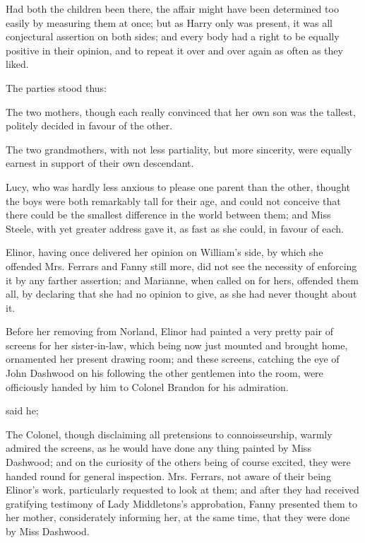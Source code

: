 Had both the children been there, the affair might have been determined too easily by measuring them at once; but as Harry only was present, it was all conjectural assertion on both sides; and every body had a right to be equally positive in their opinion, and to repeat it over and over again as often as they liked.

The parties stood thus:

The two mothers, though each really convinced that her own son was the tallest, politely decided in favour of the other.

The two grandmothers, with not less partiality, but more sincerity, were equally earnest in support of their own descendant.

Lucy, who was hardly less anxious to please one parent than the other, thought the boys were both remarkably tall for their age, and could not conceive that there could be the smallest difference in the world between them; and Miss Steele, with yet greater address gave it, as fast as she could, in favour of each.

Elinor, having once delivered her opinion on William's side, by which she offended Mrs. Ferrars and Fanny still more, did not see the necessity of enforcing it by any farther assertion; and Marianne, when called on for hers, offended them all, by declaring that she had no opinion to give, as she had never thought about it.

Before her removing from Norland, Elinor had painted a very pretty pair of screens for her sister-in-law, which being now just mounted and brought home, ornamented her present drawing room; and these screens, catching the eye of John Dashwood on his following the other gentlemen into the room, were officiously handed by him to Colonel Brandon for his admiration.

 said he; 

The Colonel, though disclaiming all pretensions to connoisseurship, warmly admired the screens, as he would have done any thing painted by Miss Dashwood; and on the curiosity of the others being of course excited, they were handed round for general inspection. Mrs. Ferrars, not aware of their being Elinor's work, particularly requested to look at them; and after they had received gratifying testimony of Lady Middletons's approbation, Fanny presented them to her mother, considerately informing her, at the same time, that they were done by Miss Dashwood.

